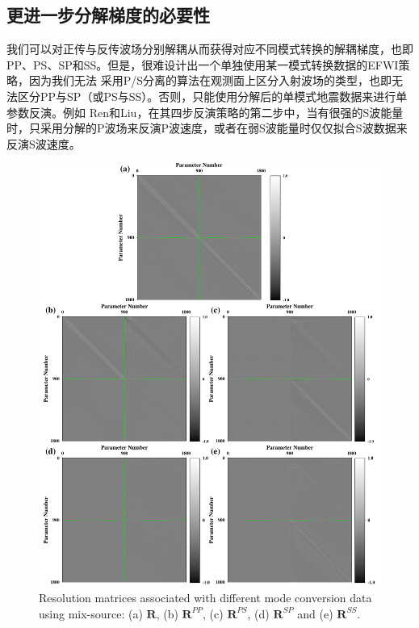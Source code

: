 \subsection{更进一步分解梯度的必要性}
我们可以对正传与反传波场分别解耦从而获得对应不同模式转换的解耦梯度，也即PP、PS、SP和SS。但是，很难设计出一个单独使用某一模式转换数据的EFWI策略，因为我们无法
采用P/S分离的算法在观测面上区分入射波场的类型，也即无法区分PP与SP（或PS与SS）。否则，只能使用分解后的单模式地震数据来进行单参数反演。例如
Ren和Liu\cite{ren.liu:2016}，在其四步反演策略的第二步中，当有很强的S波能量时，只采用分解的P波场来反演P波速度，或者在弱S波能量时仅仅拟合S波数据来反演S波速度。
\begin{figure}
    \begin{center}
        \includegraphics[width=12cm]{Figure/chapter02/ResoOpera/Fig/resolutionMN.pdf}
        \caption{
            Resolution matrices associated with different mode conversion data using
            mix-source:
            (a) $\mathbf{R}$, (b) $\mathbf{R}^{PP}$, (c) $\mathbf{R}^{PS}$, (d)
            $\mathbf{R}^{SP}$ and (e)
            $\mathbf{R}^{SS}$.
    }
    \label{fig:ResoMN}
    \end{center}
\end{figure}

